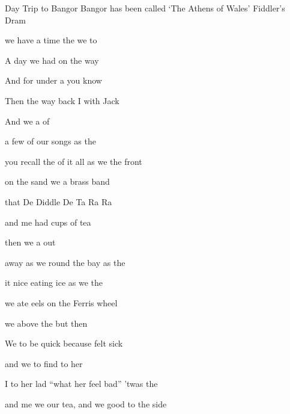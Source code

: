 \begin{SBSong}{Day Trip to Bangor}
  {Bangor has been called `The Athens of Wales'}
  {Fiddler's Dram}
  \begin{SBChorus}
	 we have a  time the  we  to 

	A  day we had  on the way
                       
	And  for under a  you know

	Then  the way back I  with Jack
   
	And we  a  of 

	 a few of our  songs as the   
  \end{SBChorus}
  \begin{SBVerse}
	 you recall the  of it all as we   the  front
	
	 on the sand we  a brass band 
	
	that  De Diddle De  Ta Ra Ra
	
	 and me had  cups of tea 
	
	then we  a   out
	
	 away as we  round the bay as the   
  \end{SBVerse}
  \WBPageBrk
  \begin{SBVerse}
	 it nice eating  ice as we   the 
	
	 we ate eels on the  Ferris wheel 
	
	we  above the  but then
	
	We  to be quick because  felt sick 
	
	and we  to find  to  her
	
	I  to her lad ``what  her feel bad'' 'twas the   
  \end{SBVerse}
  \begin{SBVerse}
	 and me we  our tea, and we  good to the  side
	

\end{SBVerse}
\end{SBSong}
